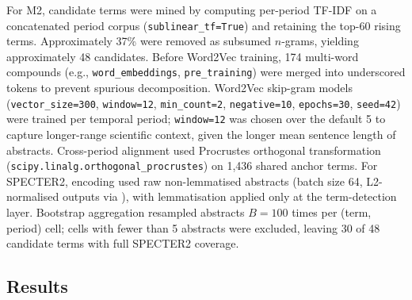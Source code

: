 For M2, candidate terms were mined by computing per-period TF-IDF on a concatenated period corpus (\texttt{sublinear\_tf=True}) and retaining the top-60 rising terms. Approximately 37\% were removed as subsumed $n$-grams, yielding approximately 48 candidates. Before Word2Vec training, 174 multi-word compounds (e.g., \texttt{word\_embeddings}, \texttt{pre\_training}) were merged into underscored tokens to prevent spurious decomposition. Word2Vec skip-gram models (\texttt{vector\_size=300}, \texttt{window=12}, \texttt{min\_count=2}, \texttt{negative=10}, \texttt{epochs=30}, \texttt{seed=42}) were trained per temporal period; \texttt{window=12} was chosen over the default 5 to capture longer-range scientific context, given the longer mean sentence length of abstracts. Cross-period alignment used Procrustes orthogonal transformation (\texttt{scipy.linalg.orthogonal\_procrustes}) on 1,436 shared anchor terms. For SPECTER2, encoding used raw non-lemmatised abstracts (batch size 64, L2-normalised outputs via \texttt{}), with lemmatisation applied only at the term-detection layer. Bootstrap aggregation resampled abstracts $B = 100$ times per (term, period) cell; cells with fewer than 5 abstracts were excluded, leaving 30 of 48 candidate terms with full SPECTER2 coverage.

\subsection{Results}
